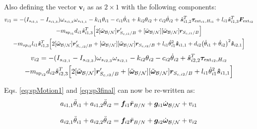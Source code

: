 \documentclass[paper]{aiaaNew}
\begin{document}
Also defining the vector $\bm v_i$ as  as $2\times1$ with the following components:
	\begin{multline}
v_{i1} = - (I_{s_{i1,1}} - I_{s_{i1,3}}) \omega_{s_{i1,3}} \omega_{s_{i1,1}} - k_{i1} \theta_{i1} - c_{i1}\dot{\theta}_{i1} 
+  k_{i2} \theta_{i2} + c_{i2} \dot\theta_{i2} 
+ \hat{\bm s}_{i1,2}^T \bm \tau_{\text{ext}_{i1},H_{i1}} + l_{i1} \hat{\bm s}_{i1,3}^T \bm F_{\text{ext}_{i2}}\\ 
- m_{\text{sp}_{i1}} d_{i1} \hat{\bm s}_{i1,3}^T \Big[2 [\tilde{\bm\omega}_{\cal B/N}] \bm{r}'_{S_{c,i1}/B}
+ [\tilde{\bm\omega}_{\cal B/N}] [\tilde{\bm\omega}_{\cal B/N}] \bm{r}_{S_{c,i1}/B}\Big]
\\
- m_{sp_{i2}} l_{i1} \hat{\bm s}_{i1,3}^T \Big[ 2 [\tilde{\bm\omega}_{\cal B/N}] \bm{r}'_{S_{c,i2}/B} 
+ [\tilde{\bm\omega}_{\cal B/N}] [\tilde{\bm\omega}_{\cal B/N}] \bm{r}_{S_{c,i2}/B} + l_{i1} \dot{\theta}_{i1}^2 \bm{\hat{s}}_{i1,1} + d_{i2}\big(\dot{\theta}_{i1} + \dot{\theta}_{i2}\big)^2\bm{\hat{s}}_{i2,1}\Big]
\label{eq:solar_panel_final8}
\end{multline}
\begin{multline}
v_{i2} = - (I_{s_{i2,1}} - I_{s_{i2,3}}) \omega_{s_{i2,3}} \omega_{s_{i2,1}}
- k_{i2} \theta_{i2} - c_{i2} \dot{\theta}_{i2} + \hat{\bm s}_{i2,2}^T \bm \tau_{\text{ext}_{i2},H_{i2}}\\  
-  m_{\text{sp}_{i2}} d_{i2} \hat{\bm s}_{i2,3}^T \Big[ 2 [\tilde{\bm\omega}_{\cal B/N}] \bm{r}'_{S_{c,i2}/B} + [\tilde{\bm\omega}_{\cal B/N}] [\tilde{\bm\omega}_{\cal B/N}] \bm{r}_{S_{c,i2}/B} + l_{i1} \dot{\theta}_{i1}^2 \bm{\hat{s}}_{i1,1} \Big]
\end{multline}

Eqs. \eqref{eq:spMotion1} and \eqref{eq:sp3final} can now be re-written as:
\begin{equation}
a_{i1,1} \ddot\theta_{i1} +  a_{i1,2} \ddot{\theta}_{i2}=\bm f_{i1} \ddot{\bm{r}}_{B/N} + \bm g_{i1}\dot{\bm\omega}_{\cal B/N} 
+v_{i1}
\label{eq:spMotion1Simple}
\end{equation}

\begin{equation}
a_{i2,1} \ddot\theta_{i1} 
+ a_{i2,2}\ddot\theta_{i2} = \bm f_{i2}\ddot{\bm{r}}_{B/N} + \bm g_{i2}\dot{\bm\omega}_{\cal B/N} + v_{i2}
\label{eq:sp3finalSimple}
\end{equation}
\end{document}
